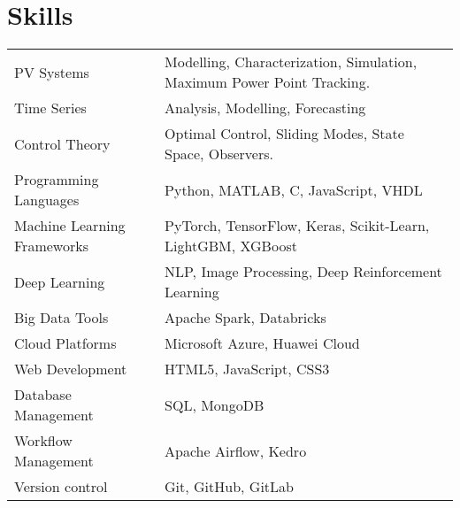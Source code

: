 \documentclass[a4paper,10pt]{article}
\begin{document}
\section{Skills}
\begin{tabularx}{\linewidth}{@{}l X@{}}
PV Systems & Modelling, Characterization, Simulation, Maximum Power Point Tracking.\\
Time Series & Analysis, Modelling, Forecasting\\
Control Theory & Optimal Control, Sliding Modes, State Space, Observers.\\
Programming Languages & Python, MATLAB, C, JavaScript, VHDL\\
Machine Learning Frameworks & PyTorch, TensorFlow, Keras, Scikit-Learn, LightGBM, XGBoost\\
Deep Learning & NLP, Image Processing, Deep Reinforcement Learning\\
Big Data Tools & Apache Spark, Databricks\\
Cloud Platforms & Microsoft Azure, Huawei Cloud\\
Web Development & HTML5, JavaScript, CSS3\\
Database Management & SQL, MongoDB\\
Workflow Management & Apache Airflow, Kedro\\
Version control & Git, GitHub, GitLab\\
\end{tabularx}



\end{document}
